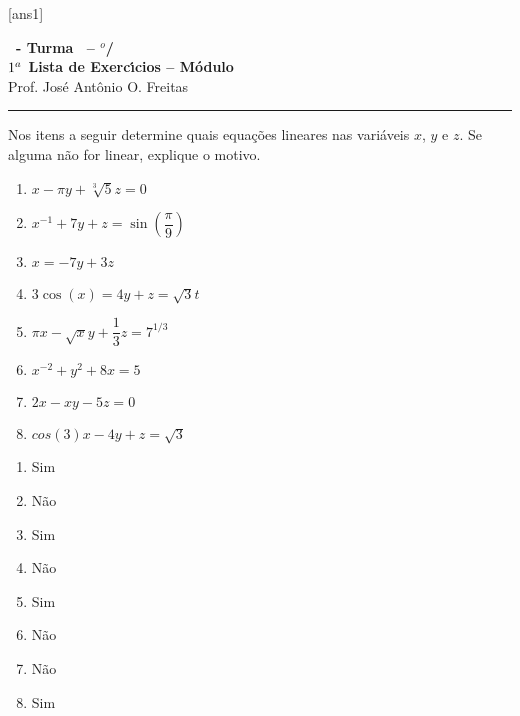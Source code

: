 \documentclass[12pt]{exam}
\begin{document}
  [ans1]
  \begin{center}
    {\Large\bf \disciplina\ - Turma \turma\ -- \semestre$^{o}$/\ano} \\ \vspace{9pt} {\large\bf
        $1^a$ Lista de Exerc{\'\i}cios -- Módulo \numeromodulo}\\ \vspace{9pt} Prof. Jos{\'e} Ant{\^o}nio O. Freitas
  \end{center}
  \hrule


\begin{exercicio}
  Nos itens a seguir determine quais equações lineares nas variáveis $x$, $y$ e $z$. Se alguma não for linear, explique o motivo.
  \begin{multicols}{2}
  \begin{enumerate}
    \item $x - \pi y + \sqrt[3]{5}z = 0$
    \item $x^{-1} + 7y + z = \sin(\dfrac{\pi}{9})$
    \item $x = -7y + 3z$
    \item $3\cos(x) = 4y + z = \sqrt{3}t$
    \item $\pi x - \sqrt{x}y + \dfrac{1}{3}z = 7^{1/3}$
    \item $x^{-2} + y^2 + 8x = 5$
    \item $2x - xy - 5z = 0$
    \item $cos(3)x - 4y + z = \sqrt{3}$
  \end{enumerate}
\end{multicols}
  \begin{solucao}
    \begin{enumerate}
      \item Sim
      \item Não
      \item Sim
      \item Não
      \item Sim
      \item Não
      \item Não
      \item Sim
    \end{enumerate}
  \end{solucao}
\end{exercicio}
\end{document}
